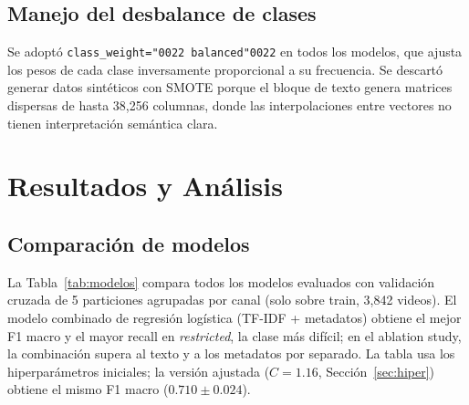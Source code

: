 \documentclass[conference]{IEEEtran}
\begin{document}
\subsection{Manejo del desbalance de clases}\label{sec:desbalance}
Se adoptó \texttt{class\_weight=\char"0022 balanced\char"0022} en todos los modelos, que ajusta los pesos de cada clase inversamente proporcional a su frecuencia. Se descartó generar datos sintéticos con SMOTE porque el bloque de texto genera matrices dispersas de hasta 38,256 columnas, donde las interpolaciones entre vectores no tienen interpretación semántica clara.

\section{Resultados y Análisis}\label{sec:resultados}

\subsection{Comparación de modelos}\label{sec:comp}
La Tabla~\ref{tab:modelos} compara todos los modelos evaluados con validación cruzada de 5 particiones agrupadas por canal (solo sobre train, 3,842 videos). El modelo combinado de regresión logística (TF-IDF + metadatos) obtiene el mejor F1 macro y el mayor recall en \textit{restricted}, la clase más difícil; en el ablation study, la combinación supera al texto y a los metadatos por separado. La tabla usa los hiperparámetros iniciales; la versión ajustada ($C=1.16$, Sección~\ref{sec:hiper}) obtiene el mismo F1 macro ($0.710 \pm 0.024$).
\end{document}
